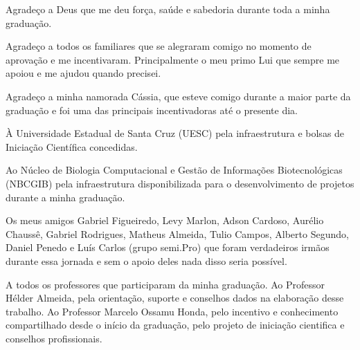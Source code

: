 \begin{agradecimentos}

Agradeço a Deus que me deu força, saúde e sabedoria durante toda a minha graduação.

Agradeço a todos os familiares que se alegraram comigo no momento de aprovação e me incentivaram. Principalmente o meu primo Lui que sempre me apoiou e me ajudou quando precisei.

Agradeço a minha namorada Cássia, que esteve comigo durante a maior parte da graduação e foi uma das principais incentivadoras até o presente dia.

À Universidade Estadual de Santa Cruz (UESC) pela infraestrutura e bolsas de Iniciação Científica concedidas.

Ao Núcleo de Biologia Computacional e Gestão de Informações Biotecnológicas (NBCGIB) pela infraestrutura disponibilizada para o desenvolvimento de projetos durante a minha graduação. 

Os meus amigos Gabriel Figueiredo, Levy Marlon, Adson Cardoso, Aurélio Chaussê, Gabriel Rodrigues, Matheus Almeida, Tulio Campos, Alberto Segundo, Daniel Penedo e Luís Carlos (grupo semi.Pro) que foram verdadeiros irmãos durante essa jornada e sem o apoio deles nada disso seria possível.

A todos os professores que participaram da minha graduação. Ao Professor Hélder Almeida, pela orientação, suporte e conselhos dados na elaboração desse trabalho. Ao Professor Marcelo Ossamu Honda, pelo incentivo e conhecimento compartilhado desde o início da graduação, pelo projeto de iniciação cientifica e conselhos profissionais.






\end{agradecimentos}
